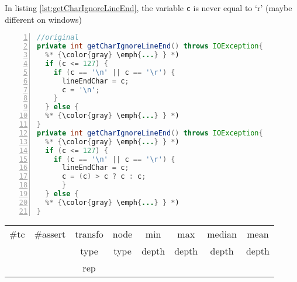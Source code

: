 In listing \ref{lst:getCharIgnoreLineEnd}, the variable \texttt{c} is never equal to  `r' (maybe different on windows) 

\begin{minipage}{\columnwidth}
\begin{lstlisting}[caption={\texttt{getCharIgnoreLineEnd} in Rhino and a sosie},label={lst:getCharIgnoreLineEnd},language=java,numbers=left]
//original
private int getCharIgnoreLineEnd() throws IOException{
  %* {\color{gray} \emph{...} } *)
  if (c <= 127) {
    if (c == '\n' || c == '\r') {
      lineEndChar = c;
      c = '\n';
    }
  } else {
  %* {\color{gray} \emph{...} } *)
}
private int getCharIgnoreLineEnd() throws IOException{
  %* {\color{gray} \emph{...} } *)
  if (c <= 127) {
    if (c == '\n' || c == '\r') {
      lineEndChar = c;
      c = (c) > c ? c : c;
      }
  } else {
  %* {\color{gray} \emph{...} } *)
}
\end{lstlisting}
\tabcolsep=0.11cm
\begin{tabular}{>{\small}c>{\small}c>{\small}c>{\small}c>{\small}c>{\small}c>{\small}c>{\small}c}
\hline
\rowcolor{lightgray} \#tc & \#assert & transfo & node & min & max & median & mean   \\
\rowcolor{lightgray}  & & type & type & depth  & depth & depth & depth  \\ 
\hline
&  & rep &  &  &  &  & \\
\hline
\end{tabular}
\end{minipage}



